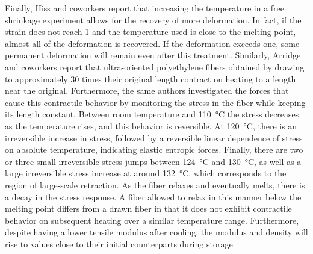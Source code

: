 Finally, Hiss and coworkers \citep{hissNetworkStretchingSlip1999} report that increasing the temperature in a free shrinkage experiment allows for the recovery of more deformation.
In fact, if the strain does not reach 1 and the temperature used is close to the melting point, almost all of the deformation is recovered.
If the deformation exceeds one, some permanent deformation will remain even after this treatment.
Similarly, Arridge and coworkers \citep{arridgeSelfhardeningHighlyOriented1977} report that ultra-oriented polyethylene fibers obtained by drawing to approximately 30 times their original length contract on heating to a length near the original.
Furthermore, the same authors investigated the forces that cause this contractile behavior by monitoring the stress in the fiber while keeping its length constant.
Between room temperature and \SI{110}{\celsius} the stress decreases as the temperature rises, and this behavior is reversible.
At \SI{120}{\celsius}, there is an irreversible increase in stress, followed by a reversible linear dependence of stress on absolute temperature, indicating elastic entropic forces.
Finally, there are two or three small irreversible stress jumps between \SI{124}{\celsius} and \SI{130}{\celsius}, as well as a large irreversible stress increase at around \SI{132}{\celsius}, which corresponds to the region of large-scale retraction.
As the fiber relaxes and eventually melts, there is a decay in the stress response.
A fiber allowed to relax in this manner below the melting point differs from a drawn fiber in that it does not exhibit contractile behavior on subsequent heating over a similar temperature range.
Furthermore, despite having a lower tensile modulus after cooling, the modulus and density will rise to values close to their initial counterparts during storage.

%

